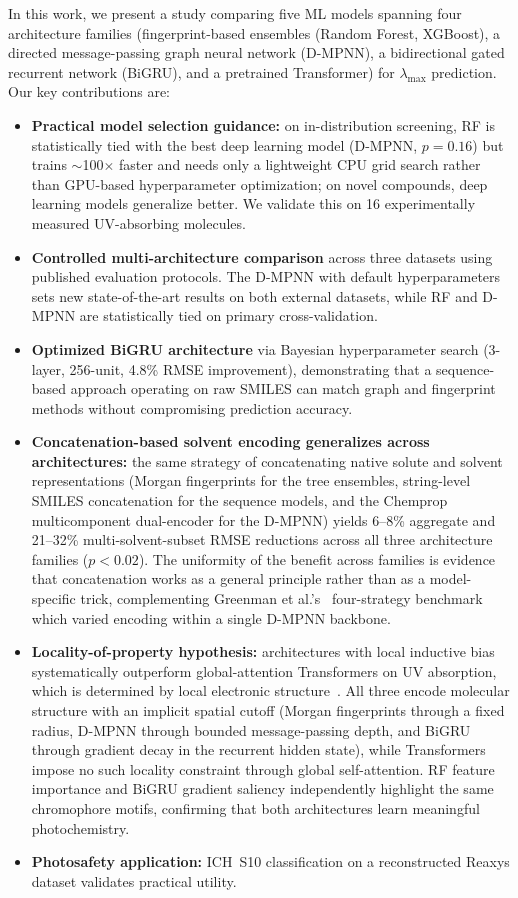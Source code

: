 \documentclass[journal=jcisd8,manuscript=article]{achemso}
\begin{document}
In this work, we present a study comparing five ML models spanning four architecture families (fingerprint-based ensembles (Random Forest, XGBoost), a directed message-passing graph neural network (D-MPNN), a bidirectional gated recurrent network (BiGRU), and a pretrained Transformer) for $\lambda_{\max}$ prediction.
Our key contributions are:
\begin{itemize}
 \item \textbf{Practical model selection guidance:} on in-distribution screening, RF is statistically tied with the best deep learning model (D-MPNN, $p = 0.16$) but trains $\sim$100$\times$ faster and needs only a lightweight CPU grid search rather than GPU-based hyperparameter optimization; on novel compounds, deep learning models generalize better. We validate this on 16 experimentally measured UV-absorbing molecules.
 \item \textbf{Controlled multi-architecture comparison} across three datasets using published evaluation protocols. The D-MPNN with default hyperparameters sets new state-of-the-art results on both external datasets, while RF and D-MPNN are statistically tied on primary cross-validation.
 \item \textbf{Optimized BiGRU architecture} via Bayesian hyperparameter search (3-layer, 256-unit, 4.8\% RMSE improvement), demonstrating that a sequence-based approach operating on raw SMILES can match graph and fingerprint methods without compromising prediction accuracy.
 \item \textbf{Concatenation-based solvent encoding generalizes across architectures:} the same strategy of concatenating native solute and solvent representations (Morgan fingerprints for the tree ensembles, string-level SMILES concatenation for the sequence models, and the Chemprop multicomponent dual-encoder for the D-MPNN) yields 6--8\% aggregate and 21--32\% multi-solvent-subset RMSE reductions across all three architecture families ($p < 0.02$). The uniformity of the benefit across families is evidence that concatenation works as a general principle rather than as a model-specific trick, complementing Greenman et al.'s~\cite{greenman2022multifidelity} four-strategy benchmark which varied encoding within a single D-MPNN backbone.
 \item \textbf{Locality-of-property hypothesis:} architectures with local inductive bias systematically outperform global-attention Transformers on UV absorption, which is determined by local electronic structure~\cite{chenMolecularLanguage2023}. All three encode molecular structure with an implicit spatial cutoff (Morgan fingerprints through a fixed radius, D-MPNN through bounded message-passing depth, and BiGRU through gradient decay in the recurrent hidden state), while Transformers impose no such locality constraint through global self-attention. RF feature importance and BiGRU gradient saliency independently highlight the same chromophore motifs, confirming that both architectures learn meaningful photochemistry.
 \item \textbf{Photosafety application:} ICH~S10 classification on a reconstructed Reaxys dataset validates practical utility.
\end{itemize}
\end{document}
